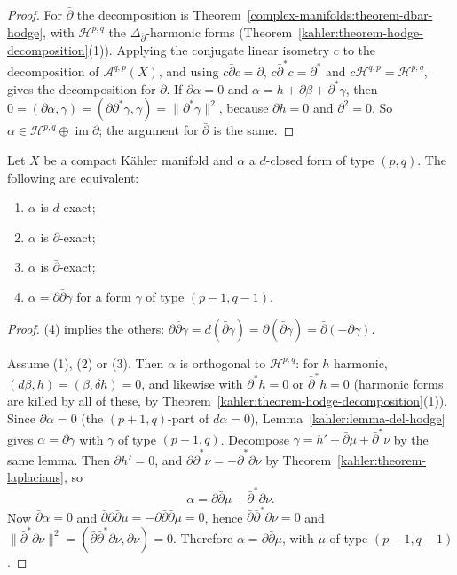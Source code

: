 \begin{proof}
For $\bar\partial$ the decomposition is Theorem~\ref{complex-manifolds:theorem-dbar-hodge}, with $\mathcal{H}^{p,q}$ the $\Delta_{\bar\partial}$-harmonic
forms (Theorem~\ref{kahler:theorem-hodge-decomposition}(1)). Applying the conjugate linear isometry $c$ to the decomposition
of $\mathcal{A}^{q,p}(X)$, and using $c\bar\partial c = \partial$, $c\bar\partial^*c = \partial^*$ and $c\mathcal{H}^{q,p} = \mathcal{H}^{p,q}$, gives
the decomposition for $\partial$. If $\partial\alpha = 0$ and $\alpha = h + \partial\beta + \partial^*\gamma$, then
$0 = (\partial\alpha, \gamma) = (\partial\partial^*\gamma, \gamma) = \|\partial^*\gamma\|^2$, because $\partial h = 0$ and $\partial^2 = 0$. So
$\alpha \in \mathcal{H}^{p,q} \oplus \operatorname{im}\partial$; the argument for $\bar\partial$ is the same.
\end{proof}

\begin{theorem}\label{kahler:theorem-ddbar-lemma}
Let $X$ be a compact K\"ahler manifold and $\alpha$ a $d$-closed form of type $(p,q)$. The following are equivalent:
\begin{enumerate}
\item $\alpha$ is $d$-exact;
\item $\alpha$ is $\partial$-exact;
\item $\alpha$ is $\bar\partial$-exact;
\item $\alpha = \partial\bar\partial\gamma$ for a form $\gamma$ of type $(p-1, q-1)$.
\end{enumerate}
\end{theorem}

\begin{proof}
(4) implies the others: $\partial\bar\partial\gamma = d(\bar\partial\gamma) = \partial(\bar\partial\gamma) = \bar\partial(-\partial\gamma)$.

Assume (1), (2) or (3). Then $\alpha$ is orthogonal to $\mathcal{H}^{p,q}$: for $h$ harmonic, $(d\beta, h) = (\beta, \delta h) = 0$, and
likewise with $\partial^*h = 0$ or $\bar\partial^*h = 0$ (harmonic forms are killed by all of these, by
Theorem~\ref{kahler:theorem-hodge-decomposition}(1)). Since $\partial\alpha = 0$ (the $(p+1,q)$-part of $d\alpha = 0$),
Lemma~\ref{kahler:lemma-del-hodge} gives $\alpha = \partial\gamma$ with $\gamma$ of type $(p-1,q)$. Decompose
$\gamma = h' + \bar\partial\mu + \bar\partial^*\nu$ by the same lemma. Then $\partial h' = 0$, and
$\partial\bar\partial^*\nu = -\bar\partial^*\partial\nu$ by Theorem~\ref{kahler:theorem-laplacians}, so
\[
\alpha = \partial\bar\partial\mu - \bar\partial^*\partial\nu .
\]
Now $\bar\partial\alpha = 0$ and $\bar\partial\partial\bar\partial\mu = -\partial\bar\partial\bar\partial\mu = 0$, hence
$\bar\partial\bar\partial^*\partial\nu = 0$ and $\|\bar\partial^*\partial\nu\|^2 = (\bar\partial\bar\partial^*\partial\nu, \partial\nu) = 0$. Therefore
$\alpha = \partial\bar\partial\mu$, with $\mu$ of type $(p-1, q-1)$.
\end{proof}

